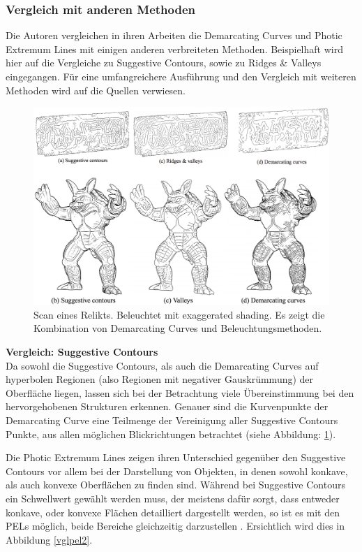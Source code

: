 \documentclass{paperStyle}
\begin{document}
\subsubsection{Vergleich mit anderen Methoden}
Die Autoren vergleichen in ihren Arbeiten die Demarcating Curves \cite{Demarcating} und Photic Extremum Lines \cite{Xie2007} mit einigen anderen verbreiteten Methoden. Beispielhaft wird hier auf die Vergleiche zu Suggestive Contours, sowie zu Ridges \& Valleys eingegangen. Für eine umfangreichere Ausführung und den Vergleich mit weiteren Methoden wird auf die Quellen verwiesen. 
\begin{figure}
	\centering
	\includegraphics[width=0.8\linewidth]{demvgl.png}
	\caption{Scan eines Relikts. Beleuchtet mit exaggerated shading. Es zeigt die Kombination von Demarcating Curves und Beleuchtungsmethoden. \cite{Demarcating}}
	\label{im:demvgl}
\end{figure}

\textbf{Vergleich: Suggestive Contours}\\
Da sowohl die Suggestive Contours, als auch die Demarcating Curves auf hyperbolen Regionen (also Regionen mit negativer Gauskrümmung) der Oberfläche liegen, lassen sich bei der Betrachtung viele Übereinstimmung bei den hervorgehobenen Strukturen erkennen. Genauer sind die Kurvenpunkte der Demarcating Curve eine Teilmenge der Vereinigung aller Suggestive Contours Punkte, aus allen möglichen Blickrichtungen betrachtet \cite{Demarcating}(siehe Abbildung: \ref{im:demvgl}).  

Die Photic Extremum Lines zeigen ihren Unterschied gegenüber den Suggestive Contours vor allem bei der Darstellung von Objekten, in denen sowohl konkave, als auch konvexe Oberflächen zu finden sind. Während bei Suggestive Contours ein Schwellwert gewählt werden muss, der meistens dafür sorgt, dass entweder konkave, oder konvexe Flächen detailliert dargestellt werden, so ist es mit den PELs möglich, beide Bereiche gleichzeitig darzustellen \cite{Xie2007}. Ersichtlich wird dies in Abbildung \ref{vglpel2}.
\end{document}
